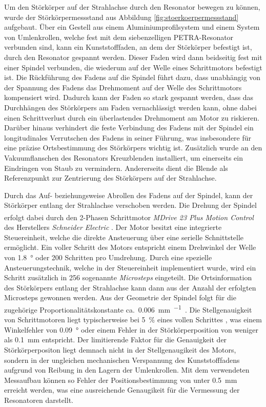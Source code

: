 Um den Störkörper auf der Strahlachse durch den Resonator bewegen zu können, wurde der Störkörpermessstand aus Abbildung \ref{fig:stoerkoerpermessstand} aufgebaut.
Über ein Gestell aus einem Aluminiumprofilsystem und einem System von Umlenkrollen, welche fest mit dem siebenzelligen PETRA-Resonator verbunden sind, kann ein Kunststofffaden, an dem der Störkörper befestigt ist, durch den Resonator gespannt werden.
Dieser Faden wird dann beidseitig fest mit einer Spindel verbunden, die wiederum auf der Welle eines Schrittmotors befestigt ist.
Die Rückführung des Fadens auf die Spindel führt dazu, dass unabhängig von der Spannung des Fadens das Drehmoment auf der Welle des Schrittmotors kompensiert wird.
Dadurch kann der Faden so stark gespannt werden, dass das Durchhängen des Störkörpers am Faden vernachlässigt werden kann, ohne dabei einen Schrittverlust durch ein überlastendes Drehmoment am Motor zu riskieren.
Darüber hinaus verhindert die feste Verbindung des Fadens mit der Spindel ein longitudinales Verrutschen des Fadens in seiner Führung, was insbesondere für eine präzise Ortsbestimmung des Störkörpers wichtig ist.
Zusätzlich wurde an den Vakuumflanschen des Resonators Kreuzblenden installiert, um einerseits ein Eindringen von Staub zu vermindern. Andererseits dient die Blende als Referenzpunkt zur Zentrierung des Störkörpers auf der Strahlachse.

Durch das Auf- beziehungsweise Abrollen des Fadens auf der Spindel, kann der Störkörper entlang der Strahlachse verschoben werden.
Die Drehung der Spindel erfolgt dabei durch den 2-Phasen Schrittmotor \textit{MDrive\textsuperscript{\textregistered} 23 Plus Motion Control} des Herstellers \textit{Schneider Electric} \cite{motor_datasheet}.
Der Motor besitzt eine integrierte Steuereinheit, welche die direkte Ansteuerung über eine serielle Schnittstelle ermöglicht.
Ein voller Schritt des Motors entspricht einem Drehwinkel der Welle von \SI{1.8}{\degree} oder \num{200} Schritten pro Umdrehung.
Durch eine spezielle Ansteuerungstechnik, welche in der Steuereinheit implementiert wurde, wird ein Schritt zusätzlich in \num{256} sogenannte \textit{Microsteps} eingeteilt.
Die Ortsinformation des Störkörpers entlang der Strahlachse kann dann aus der Anzahl der erfolgten Microsteps gewonnen werden.
Aus der Geometrie der Spindel folgt für die zugehörige Proportionalitätskonstante ca.\ \SI{0.006}{\milli\metre\per\micro\step}.
Die Stellgenauigkeit von Schrittmotoren liegt typischerweise bei \SI{5}{\percent} eines vollen Schrittes \cite{gecko}, was einem Winkelfehler von \SI{0.09}{\degree} oder einem Fehler in der Störkörperposition von weniger als \SI{0.1}{\milli\metre} entspricht.
Der limitierende Faktor für die Genauigkeit der Störkörperpositon liegt demnach nicht in der Stellgenaugikeit des Motors, sondern in der ungleichen mechanischen Verspannung des Kunststofffadens aufgrund von Reibung in den Lagern der Umlenkrollen.
Mit dem verwendeten Messaufbau können so Fehler der Positionsbestimmung von unter \SI{0.5}{mm} erreicht werden, was eine ausreichende Genaugikeit für die Vermessung der Resonatoren darstellt.

